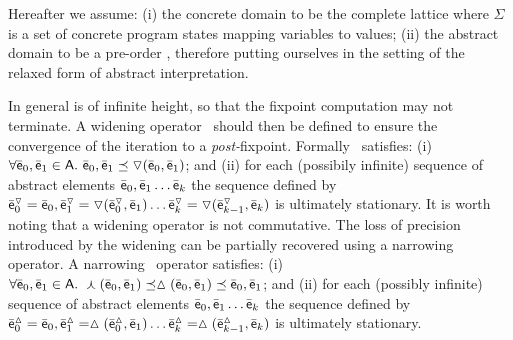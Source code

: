 \documentclass{llncs}
\begin{document}
Hereafter we assume: (i) the concrete domain to be the complete lattice \tupla{\parti{\Sigma}, \subseteq, \cup, \cap} where $\Sigma$ is a set of concrete program states mapping variables to values;
(ii) the abstract domain to be a pre-order , therefore putting ourselves in the setting of the relaxed form of abstract interpretation.

In general  is of infinite height, so that the fixpoint computation may not terminate.
A widening operator \awidening\ should then be defined to ensure the convergence of the iteration to a \emph{post-}fixpoint.
Formally \awidening\ satisfies: (i) $ \forall \bar{\mathsf{\mathsf{e}}}_0, \bar{\mathsf{\mathsf{e}}}_1 \in \mathsf{A}.\ \bar{\mathsf{\mathsf{e}}}_0, \bar{\mathsf{\mathsf{e}}}_1 \preceq \triangledown (\bar{\mathsf{\mathsf{e}}}_0, \bar{\mathsf{\mathsf{e}}}_1)$; and (ii) for each (possibily infinite) sequence of abstract elements $\bar{\mathsf{\mathsf{e}}}_0, \bar{\mathsf{\mathsf{e}}}_1 \dots \bar{\mathsf{\mathsf{e}}}_k $ the sequence defined by $\bar{\mathsf{\mathsf{e}}}_0^{\triangledown} = \bar{\mathsf{\mathsf{e}}}_0, \bar{\mathsf{\mathsf{e}}}_1^{\triangledown} = \triangledown (\bar{\mathsf{\mathsf{e}}}^{\triangledown}_0, \bar{\mathsf{\mathsf{e}}}_1)  \dots \bar{\mathsf{\mathsf{e}}}^{\triangledown}_k = \triangledown (\bar{\mathsf{\mathsf{e}}}^{\triangledown}_{k-1}, \bar{\mathsf{\mathsf{e}}}_{k})$  is ultimately stationary.
It is worth noting that a widening operator is not commutative.
The loss of precision introduced by the widening can be partially recovered using a narrowing operator.
A narrowing \narrowing\ operator satisfies: (i) $\forall \bar{\mathsf{\mathsf{e}}}_0, \bar{\mathsf{\mathsf{e}}}_1 \in \mathsf{A}.\ \curlywedge(\bar{\mathsf{\mathsf{e}}}_0,\bar{\mathsf{\mathsf{e}}}_1) \preceq \vartriangle(\bar{\mathsf{\mathsf{e}}}_0, \bar{\mathsf{\mathsf{e}}}_1) \preceq \bar{\mathsf{\mathsf{e}}}_0, \bar{\mathsf{\mathsf{e}}}_1$; and (ii) for each (possibly infinite) sequence of abstract elements $\bar{\mathsf{\mathsf{e}}}_0, \bar{\mathsf{\mathsf{e}}}_1 \dots \bar{\mathsf{\mathsf{e}}}_k $ the sequence defined by $\bar{\mathsf{\mathsf{e}}}_0^{\vartriangle} = \bar{\mathsf{\mathsf{e}}}_0, \bar{\mathsf{\mathsf{e}}}_1^{\vartriangle} = \vartriangle (\bar{\mathsf{\mathsf{e}}}^{\vartriangle}_0, \bar{\mathsf{\mathsf{e}}}_1)  \dots \bar{\mathsf{\mathsf{e}}}^{\vartriangle}_k = \vartriangle (\bar{\mathsf{\mathsf{e}}}^{\vartriangle}_{k-1}, \bar{\mathsf{\mathsf{e}}}_{k})$  is ultimately stationary.
\end{document}
